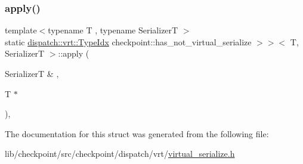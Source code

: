\subsubsection{\texorpdfstring{apply()}{apply()}}
{\footnotesize\ttfamily template$<$typename T , typename SerializerT $>$ \\
static \hyperlink{namespacecheckpoint_1_1dispatch_1_1vrt_acd3f9e6b091bcfbc23dc35ea8ef45d3b}{dispatch\+::vrt\+::\+Type\+Idx} checkpoint\+::has\+\_\+not\+\_\+virtual\+\_\+serialize $>$$>$$<$ T, SerializerT $>$\+::apply (\begin{DoxyParamCaption}\item[{SerializerT \&}]{,  }\item[{T $\ast$}]{ }\end{DoxyParamCaption})\hspace{0.3cm}{\ttfamily [inline]}, {\ttfamily [static]}}



The documentation for this struct was generated from the following file\+:\begin{DoxyCompactItemize}
\item 
lib/checkpoint/src/checkpoint/dispatch/vrt/\hyperlink{virtual__serialize_8h}{virtual\+\_\+serialize.\+h}\end{DoxyCompactItemize}
